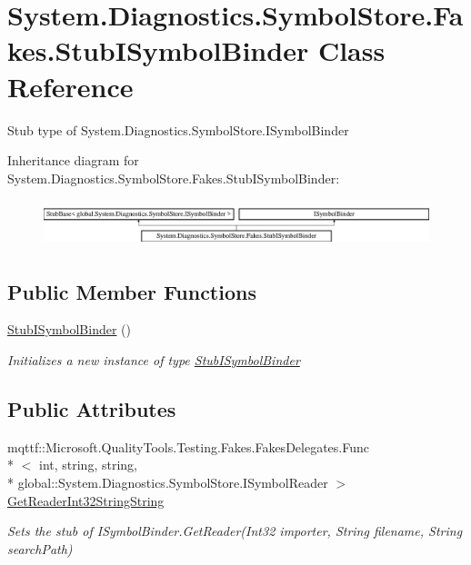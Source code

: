 \hypertarget{class_system_1_1_diagnostics_1_1_symbol_store_1_1_fakes_1_1_stub_i_symbol_binder}{\section{System.\-Diagnostics.\-Symbol\-Store.\-Fakes.\-Stub\-I\-Symbol\-Binder Class Reference}
\label{class_system_1_1_diagnostics_1_1_symbol_store_1_1_fakes_1_1_stub_i_symbol_binder}
}


Stub type of System.\-Diagnostics.\-Symbol\-Store.\-I\-Symbol\-Binder 


Inheritance diagram for System.\-Diagnostics.\-Symbol\-Store.\-Fakes.\-Stub\-I\-Symbol\-Binder\-:\begin{figure}[H]
\begin{center}
\leavevmode
\includegraphics[height=1.386139cm]{class_system_1_1_diagnostics_1_1_symbol_store_1_1_fakes_1_1_stub_i_symbol_binder}
\end{center}
\end{figure}
\subsection*{Public Member Functions}
\begin{DoxyCompactItemize}
\item 
\hyperlink{class_system_1_1_diagnostics_1_1_symbol_store_1_1_fakes_1_1_stub_i_symbol_binder_aa55d73e74f926071ca79765f32b486e8}{Stub\-I\-Symbol\-Binder} ()
\begin{DoxyCompactList}\small\item\em Initializes a new instance of type \hyperlink{class_system_1_1_diagnostics_1_1_symbol_store_1_1_fakes_1_1_stub_i_symbol_binder}{Stub\-I\-Symbol\-Binder}\end{DoxyCompactList}\end{DoxyCompactItemize}
\subsection*{Public Attributes}
\begin{DoxyCompactItemize}
\item 
mqttf\-::\-Microsoft.\-Quality\-Tools.\-Testing.\-Fakes.\-Fakes\-Delegates.\-Func\\*
$<$ int, string, string, \\*
global\-::\-System.\-Diagnostics.\-Symbol\-Store.\-I\-Symbol\-Reader $>$ \hyperlink{class_system_1_1_diagnostics_1_1_symbol_store_1_1_fakes_1_1_stub_i_symbol_binder_a7e893f0fae5d8d52bfca1f997a52317d}{Get\-Reader\-Int32\-String\-String}
\begin{DoxyCompactList}\small\item\em Sets the stub of I\-Symbol\-Binder.\-Get\-Reader(\-Int32 importer, String filename, String search\-Path)\end{DoxyCompactList}\end{DoxyCompactItemize}



